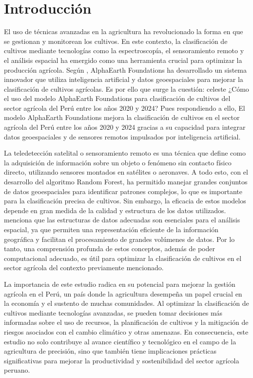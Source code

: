 \section{Introducción}

El uso de técnicas avanzadas en la agricultura ha revolucionado la forma en que se gestionan y monitorean los cultivos. En este contexto, la clasificación de cultivos mediante tecnologías como la espectroscopía, el sensoramiento remoto y el análisis espacial ha emergido como una herramienta crucial para optimizar la producción agrícola. Según \cite{Brown2025}, AlphaEarth Foundations ha desarrollado un sistema innovador que utiliza inteligencia artificial y datos geoespaciales para mejorar la clasificación de cultivos agrícolas. Es por ello que surge la cuestión: celeste ¿Cómo el uso del modelo AlphaEarth Foundations para clasificación de cultivos del sector agrícola del Perú entre los años 2020 y 2024? Pues respondiendo a ello, El modelo AlphaEarth Foundations mejora la clasificación de cultivos en el sector agrícola del Perú entre los años 2020 y 2024 gracias a su capacidad para integrar datos geoespaciales y de sensores remotos impulsados por inteligencia artificial.

La teledetección satelital o sensoramiento remoto es una técnica que \cite{En2009} define como la adquisición de información sobre un objeto o fenómeno sin contacto físico directo, utilizando sensores montados en satélites o aeronaves. A todo esto, \cite{Gorelick2017} con el desarrollo del algoritmo Random Forest, ha permitido manejar grandes conjuntos de datos geoespaciales para identificar patrones complejos, lo que es importante para la clasificación precisa de cultivos. Sin embargo, la eficacia de estos modelos depende en gran medida de la calidad y estructura de los datos utilizados. \cite{Breiman2001} menciona que las estructuras de datos adecuadas son esenciales para el análisis espacial, ya que permiten una representación eficiente de la información geográfica y facilitan el procesamiento de grandes volúmenes de datos. Por lo tanto, una comprensión profunda de estos conceptos, además de poder computacional adecuado, es útil para optimizar la clasificación de cultivos en el sector agrícola del contexto previamente mencionado.

La importancia de este estudio radica en su potencial para mejorar la gestión agrícola en el Perú, un país donde la agricultura desempeña un papel crucial en la economía y el sustento de muchas comunidades. Al optimizar la clasificación de cultivos mediante tecnologías avanzadas, se pueden tomar decisiones más informadas sobre el uso de recursos, la planificación de cultivos y la mitigación de riesgos asociados con el cambio climático y otras amenazas. En consecuencia, este estudio no solo contribuye al avance científico y tecnológico en el campo de la agricultura de precisión, sino que también tiene implicaciones prácticas significativas para mejorar la productividad y sostenibilidad del sector agrícola peruano.

